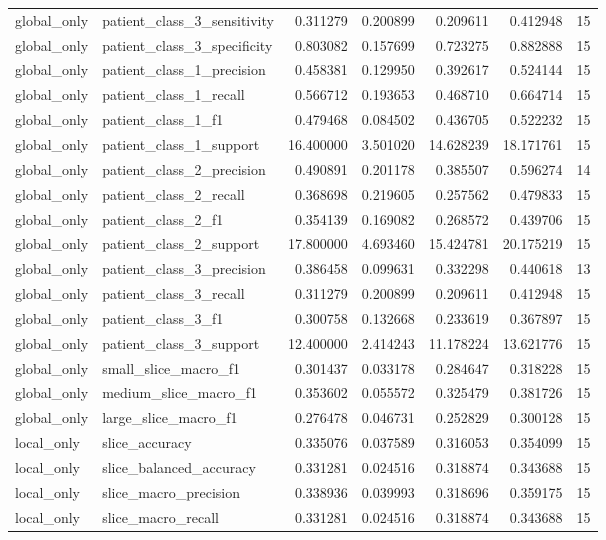 \begin{tabular}{llrrrrr}
global_only & patient_class_3_sensitivity & 0.311279 & 0.200899 & 0.209611 & 0.412948 & 15 \\
global_only & patient_class_3_specificity & 0.803082 & 0.157699 & 0.723275 & 0.882888 & 15 \\
global_only & patient_class_1_precision & 0.458381 & 0.129950 & 0.392617 & 0.524144 & 15 \\
global_only & patient_class_1_recall & 0.566712 & 0.193653 & 0.468710 & 0.664714 & 15 \\
global_only & patient_class_1_f1 & 0.479468 & 0.084502 & 0.436705 & 0.522232 & 15 \\
global_only & patient_class_1_support & 16.400000 & 3.501020 & 14.628239 & 18.171761 & 15 \\
global_only & patient_class_2_precision & 0.490891 & 0.201178 & 0.385507 & 0.596274 & 14 \\
global_only & patient_class_2_recall & 0.368698 & 0.219605 & 0.257562 & 0.479833 & 15 \\
global_only & patient_class_2_f1 & 0.354139 & 0.169082 & 0.268572 & 0.439706 & 15 \\
global_only & patient_class_2_support & 17.800000 & 4.693460 & 15.424781 & 20.175219 & 15 \\
global_only & patient_class_3_precision & 0.386458 & 0.099631 & 0.332298 & 0.440618 & 13 \\
global_only & patient_class_3_recall & 0.311279 & 0.200899 & 0.209611 & 0.412948 & 15 \\
global_only & patient_class_3_f1 & 0.300758 & 0.132668 & 0.233619 & 0.367897 & 15 \\
global_only & patient_class_3_support & 12.400000 & 2.414243 & 11.178224 & 13.621776 & 15 \\
global_only & small_slice_macro_f1 & 0.301437 & 0.033178 & 0.284647 & 0.318228 & 15 \\
global_only & medium_slice_macro_f1 & 0.353602 & 0.055572 & 0.325479 & 0.381726 & 15 \\
global_only & large_slice_macro_f1 & 0.276478 & 0.046731 & 0.252829 & 0.300128 & 15 \\
local_only & slice_accuracy & 0.335076 & 0.037589 & 0.316053 & 0.354099 & 15 \\
local_only & slice_balanced_accuracy & 0.331281 & 0.024516 & 0.318874 & 0.343688 & 15 \\
local_only & slice_macro_precision & 0.338936 & 0.039993 & 0.318696 & 0.359175 & 15 \\
local_only & slice_macro_recall & 0.331281 & 0.024516 & 0.318874 & 0.343688 & 15 \\

\end{tabular}
